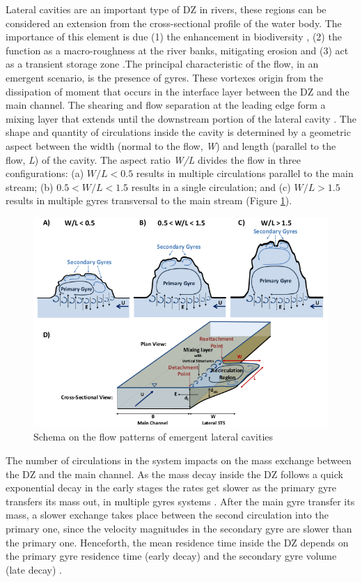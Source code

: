 \documentclass[../main.tex]{subfiles}
\begin{document}
Lateral cavities are an important type of DZ in rivers, these regions can be considered an extension from the cross-sectional profile of the water body. The importance of this element is due (1) the enhancement in biodiversity \cite{ribi2014,harvey2016}, (2) the function as a macro-roughness at the river banks, mitigating erosion \cite{juez2018} and (3) act as a transient storage zone \cite{jackson2013,drost2014,jackson2015}.The principal characteristic of the flow, in an emergent scenario, is the presence of gyres. These vortexes origin from the dissipation of moment that occurs in the interface layer between the DZ and the main channel. The shearing and flow separation at the leading edge form a mixing layer that extends until the downstream portion of the lateral cavity \cite{uijttewaal2005,jackson2013}. The shape and quantity of circulations inside the cavity is determined by a geometric aspect between the width (normal to the flow, \textit{W}) and length (parallel to the flow, \textit{L}) of the cavity. The aspect ratio \textit{W/L} divides the flow in three configurations: (a) $W/L<0.5$ results in multiple circulations parallel to the main stream; (b) $0.5<W/L<1.5$ results in a single circulation; and (c) $W/L>1.5$ results in multiple gyres transversal to the main stream \cite{weitbrecht2001,jackson2013,sukhodolov2014}(Figure \ref{fig:lCavitySchema}).

\begin{figure}[!ht]
\centering
\includegraphics[width=0.9\linewidth]{../images/introduction/lateralCavitySchema.png}
\caption{Schema on the flow patterns of emergent lateral cavities \cite{jackson2013}}
\label{fig:lCavitySchema}
\end{figure}

The number of circulations in the system impacts on the mass exchange between the DZ and the main channel. As the mass decay inside the DZ follows a quick exponential decay in the early stages the rates get slower as the primary gyre transfers its mass out, in multiple gyres systems \cite{jackson2012}. After the main gyre transfer its mass, a slower exchange takes place between the second circulation into the primary one, since the velocity magnitudes in the secondary gyre are slower than the primary one. Henceforth, the mean residence time inside the DZ depends on the primary gyre residence time (early decay) and the secondary gyre volume (late decay) \cite{jackson2013}.
\end{document}
